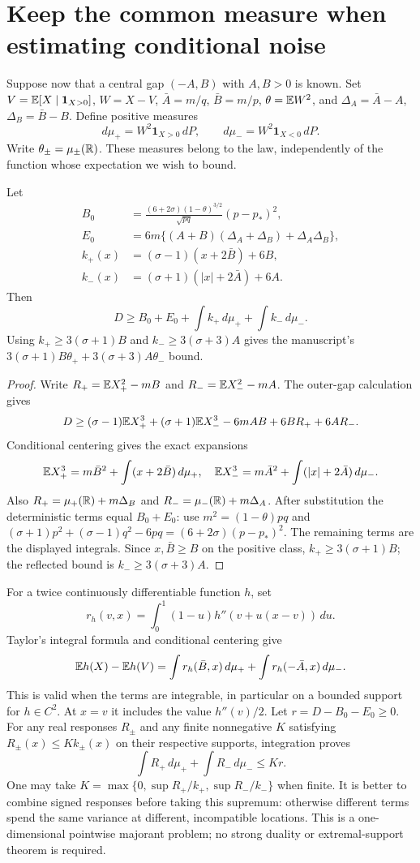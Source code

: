 \section{Keep the common measure when estimating conditional noise}

Suppose now that a central gap $(-A,B)$ with $A,B>0$ is known. Set
$V=\mathbb E[X\mid\mathbf1_{X>0}]$, $W=X-V$,
$\bar A=m/q$, $\bar B=m/p$, $\theta=\mathbb E W^2$, and
$\Delta_A=\bar A-A$, $\Delta_B=\bar B-B$.
Define positive measures
\[
 d\mu_+=W^2\mathbf1_{X>0}\,dP,\qquad
 d\mu_-=W^2\mathbf1_{X<0}\,dP.
\]
Write $\theta_\pm=\mu_\pm(\mathbb R)$. These measures belong to the law, independently of the function whose
expectation we wish to bound.

\begin{proposition}
Let
\begin{align*}
 B_0&=\frac{(6+2\sigma)(1-\theta)^{3/2}}{\sqrt{pq}}(p-p_*)^2,\\
 E_0&=6m\{(A+B)(\Delta_A+\Delta_B)+\Delta_A\Delta_B\},\\
 k_+(x)&=(\sigma-1)(x+2\bar B)+6B,\\
 k_-(x)&=(\sigma+1)(|x|+2\bar A)+6A.
\end{align*}
Then
\[
 D\ge B_0+E_0+\int k_+\,d\mu_++\int k_-\,d\mu_-.
\]
Using $k_+\ge3(\sigma+1)B$ and $k_-\ge3(\sigma+3)A$ gives the manuscript's
$3(\sigma+1)B\theta_++3(\sigma+3)A\theta_-$ bound.
\end{proposition}
\begin{proof}
Write $R_+=\mathbb E X_+^2-mB$ and $R_-=\mathbb E X_-^2-mA$.
The outer-gap calculation gives
\[
 D\ge(\sigma-1)\mathbb E X_+^3+(\sigma+1)\mathbb E X_-^3
                  -6mAB+6BR_++6AR_-.
\]
Conditional centering gives the exact expansions
\[
 \mathbb E X_+^3=m\bar B^2+\int(x+2\bar B)\,d\mu_+,
 \quad
 \mathbb E X_-^3=m\bar A^2+\int(|x|+2\bar A)\,d\mu_-.
\]
Also $R_+=\mu_+(\mathbb R)+m\Delta_B$ and
$R_-=\mu_-(\mathbb R)+m\Delta_A$.
After substitution the deterministic terms equal $B_0+E_0$:
use $m^2=(1-\theta)pq$ and
$(\sigma+1)p^2+(\sigma-1)q^2-6pq=(6+2\sigma)(p-p_*)^2$.
The remaining terms are the displayed integrals.
Since $x,\bar B\ge B$ on the positive class, $k_+\ge3(\sigma+1)B$;
the reflected bound is $k_-\ge3(\sigma+3)A$.
\end{proof}

For a twice continuously differentiable function $h$, set
\[
 r_h(v,x)=\int_0^1(1-u)h''(v+u(x-v))\,du.
\]
Taylor's integral formula and conditional centering give
\[
 \mathbb E h(X)-\mathbb E h(V)=\int r_h(\bar B,x)\,d\mu_+
                    +\int r_h(-\bar A,x)\,d\mu_-.
\]
This is valid when the terms are integrable, in particular on a bounded
support for $h\in C^2$. At $x=v$ it includes the value $h''(v)/2$.
Let $r=D-B_0-E_0\ge0$. For any real responses $R_\pm$ and any finite
nonnegative $K$ satisfying $R_\pm(x)\le Kk_\pm(x)$ on their respective
supports, integration proves
\[
 \int R_+\,d\mu_++\int R_-\,d\mu_-\le Kr.
\]
One may take $K=\max\{0,\sup R_+/k_+,\sup R_-/k_-\}$ when finite.
It is better to combine signed responses before taking this supremum:
otherwise different terms spend the same variance at different, incompatible
locations. This is a one-dimensional pointwise majorant problem; no
strong duality or extremal-support theorem is required.

